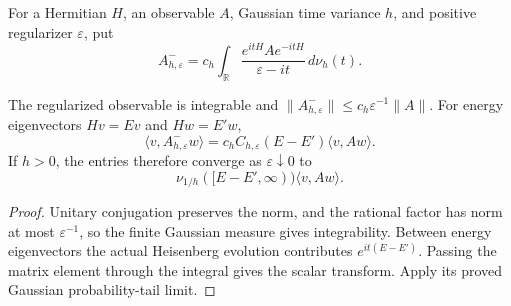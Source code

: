 \begin{definition}
    \label{def:hk_regularized_negative_frequency_operator}
    \leanok
    For a Hermitian $H$, an observable $A$, Gaussian time variance $h$,
    and positive regularizer $\varepsilon$, put
    \[
        A^-_{h,\varepsilon}
        =c_h\int_{\mathbb R}
        \frac{e^{itH}Ae^{-itH}}{\varepsilon-it}\,d\nu_h(t).
    \]
\end{definition}

\begin{lemma}
    \label{lem:hk_regularized_frequency_matrix_elements}
    \leanok
    The regularized observable is integrable and
    $\|A^-_{h,\varepsilon}\|\le c_h\varepsilon^{-1}\|A\|$.
    For energy eigenvectors $Hv=Ev$ and $Hw=E'w$,
    \[
        \langle v,A^-_{h,\varepsilon}w\rangle
        =c_hC_{h,\varepsilon}(E-E')\langle v,Aw\rangle.
    \]
    If $h>0$, the entries therefore converge as
    $\varepsilon\downarrow0$ to
    \[
        \nu_{1/h}([E-E',\infty))\langle v,Aw\rangle.
    \]
\end{lemma}
\begin{proof}\leanok
    Unitary conjugation preserves the norm, and the rational factor has
    norm at most $\varepsilon^{-1}$, so the finite Gaussian measure
    gives integrability. Between energy eigenvectors the actual
    Heisenberg evolution contributes $e^{it(E-E')}$. Passing the matrix
    element through the integral gives the scalar transform.
    Apply its proved Gaussian probability-tail limit.
\end{proof}

